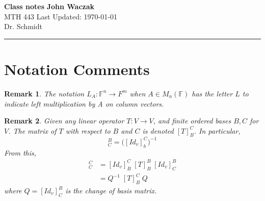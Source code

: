 \documentclass[a4paper, 11pt]{article}
\newtheorem*{Remark}{Remark}
\newcommand{\F}{\mathbb{F}}
\begin{document}
\noindent
\large\textbf{Class notes} \hfill \textbf{John Waczak} \\
\normalsize MTH 443 \hfill  Last Updated: \today \\
Dr. Schmidt
\par\noindent\rule{\textwidth}{0.4pt}	
	
\section*{Notation Comments} 
	\begin{Remark}
		The notation $L_A:\F^n \to F^m$ when $A\in M_n(\F)$ has the letter $L$ to indicate left multiplication by A on column vectors. 
	\end{Remark}

	\begin{Remark}
		Given any linear operator $T:V\to V$, and finite ordered bases $B, C$ for $V$. The matrix of $T$ with respect to $B$ and $C$ is denoted $[T]_B^C$. In particular, 
			\begin{equation}
				[Id_v]_C^B = \Big([Id_v]_b^C\Big)^{-1}
			\end{equation}
		From this, 
			\begin{align}
				[T]_C^C &= [Id_v]_B^C\; [T]_B^B\; [Id_v]_C^B \\ 
					&= Q^{-1}\;[T]_B^C\; Q
			\end{align}
		where $Q = [Id_v]_C^B$ is the change of basis matrix. 
	\end{Remark}
\end{document}
